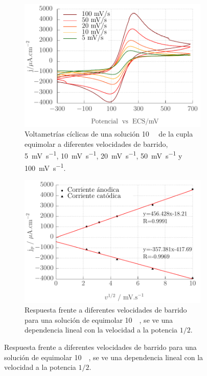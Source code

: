 {\begin{figure}[ht]
 	     	\begin{subfigure}[t]{0.495\textwidth}
         		\includegraphics[width=\textwidth]{Graficos/Velocidades_Fe.pdf}
        	    \caption{Voltametrías cíclicas de una solución \SI{10}{\milli\Molar} de la cupla equimolar \fe\space a diferentes velocidades de barrido, \SI{5}{\milli\volt\per\second}, \SI{10}{\milli\volt\per\second}, \SI{20}{\milli\volt\per\second}, \SI{50}{\milli\volt\per\second} y \SI{100}{\milli\volt\per\second}.}
        	    \label{fig:Fe_c}
     		 	\end{subfigure}
     	 	\begin{subfigure}[t]{0.495\textwidth}
        		\includegraphics[width=\textwidth]{Graficos/VelocidadesCal_Fe.pdf}
       			\caption[Respuesta a diferentes velocidades de barrido para \fe]{Respuesta frente a diferentes velocidades de barrido para una solución de \fe\space equimolar \SI{10}{\milli\Molar}, se ve una dependencia lineal con la velocidad a la potencia $1/2$.}

\end{subfigure}
\end{figure}}
